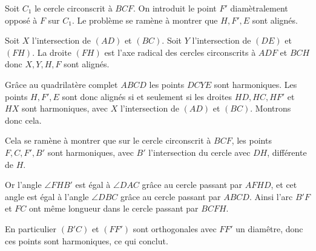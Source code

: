 \begin{sol}

Soit $C_1$ le cercle circonscrit à $BCF$. On introduit le point $F'$ diamètralement opposé à $F$ sur $C_1$. Le problème se ramène à montrer que $H,F',E$ sont alignés. 

\medskip

Soit $X$ l'intersection de $(AD)$ et $(BC)$. Soit $Y$ l'intersection de $(DE)$ et $(FH)$. La droite $(FH)$ est l'axe radical des cercles circonscrits à $ADF$ et $BCH$ donc $X,Y,H,F$ sont alignés. 

Grâce au quadrilatère complet $ABCD$ les points $DCYE$ sont harmoniques. Les points $H,F',E$ sont donc alignés si et seulement si les droites $HD,HC,HF'$ et $HX$ sont harmoniques, avec $X$ l'intersection de $(AD)$ et $(BC)$. Montrons donc cela. 

\medskip

Cela se ramène à montrer que sur le cercle circonscrit à $BCF$, les points $F,C,F',B'$ sont harmoniques, avec $B'$ l'intersection du cercle avec $DH$, différente de $H$. 

Or l'angle $\angle FHB'$ est égal à $\angle DAC$ grâce au cercle passant par $AFHD$, et cet angle est égal à l'angle $\angle DBC$ grâce au cercle passant par $ABCD$. Ainsi l'arc $B'F$ et $FC$ ont même longueur dans le cercle passant par $BCFH$. 

En particulier $(B'C)$ et $(FF')$ sont orthogonales avec $FF'$ un diamêtre, donc ces points sont harmoniques, ce qui conclut.


\end{sol}
